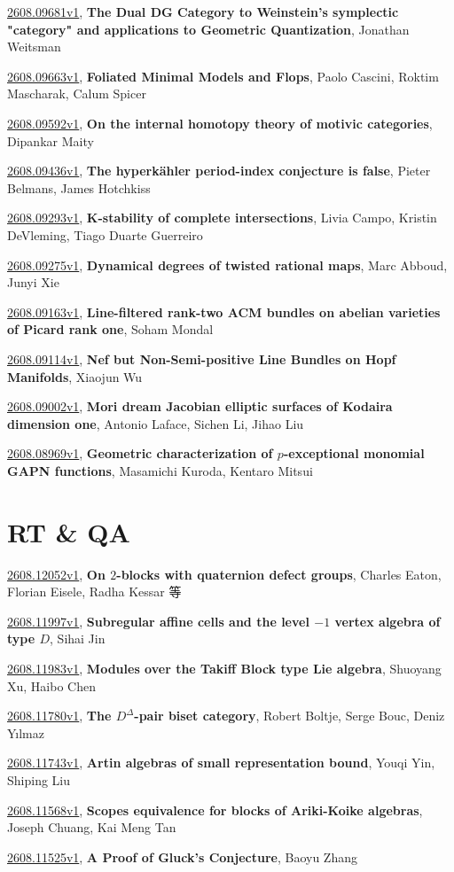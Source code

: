 \documentclass[9pt, a4paper]{article}
\theoremstyle{plain}
\theoremstyle{definition}
\theoremstyle{remark}
\newcommand{\arxiv}[3]{\href{https://arxiv.org/abs/#1}{#1}, \textbf{\textcolor{arxivblue}{#2}}, #3}
\begin{document}
\arxiv{2608.09681v1}{The Dual DG Category to Weinstein's symplectic "category" and applications to Geometric Quantization}{Jonathan Weitsman}

\arxiv{2608.09663v1}{Foliated Minimal Models and Flops}{Paolo Cascini, Roktim Mascharak, Calum Spicer}

\arxiv{2608.09592v1}{On the internal homotopy theory of motivic categories}{Dipankar Maity}

\arxiv{2608.09436v1}{The hyperkähler period-index conjecture is false}{Pieter Belmans, James Hotchkiss}

\arxiv{2608.09293v1}{K-stability of complete intersections}{Livia Campo, Kristin DeVleming, Tiago Duarte Guerreiro}

\arxiv{2608.09275v1}{Dynamical degrees of twisted rational maps}{Marc Abboud, Junyi Xie}

\arxiv{2608.09163v1}{Line-filtered rank-two ACM bundles on abelian varieties of Picard rank one}{Soham Mondal}

\arxiv{2608.09114v1}{Nef but Non-Semi-positive Line Bundles on Hopf Manifolds}{Xiaojun Wu}

\arxiv{2608.09002v1}{Mori dream Jacobian elliptic surfaces of Kodaira dimension one}{Antonio Laface, Sichen Li, Jihao Liu}

\arxiv{2608.08969v1}{Geometric characterization of $p$-exceptional monomial GAPN functions}{Masamichi Kuroda, Kentaro Mitsui}


\section{RT \& QA}
\arxiv{2608.12052v1}{On $2$-blocks with quaternion defect groups}{Charles Eaton, Florian Eisele, Radha Kessar 等}

\arxiv{2608.11997v1}{Subregular affine cells and the level $-1$ vertex algebra of type $D$}{Sihai Jin}

\arxiv{2608.11983v1}{Modules over the Takiff Block type Lie algebra}{Shuoyang Xu, Haibo Chen}

\arxiv{2608.11780v1}{The $D^Δ$-pair biset category}{Robert Boltje, Serge Bouc, Deniz Yılmaz}

\arxiv{2608.11743v1}{Artin algebras of small representation bound}{Youqi Yin, Shiping Liu}

\arxiv{2608.11568v1}{Scopes equivalence for blocks of Ariki-Koike algebras}{Joseph Chuang, Kai Meng Tan}

\arxiv{2608.11525v1}{A Proof of Gluck's Conjecture}{Baoyu Zhang}
\end{document}

